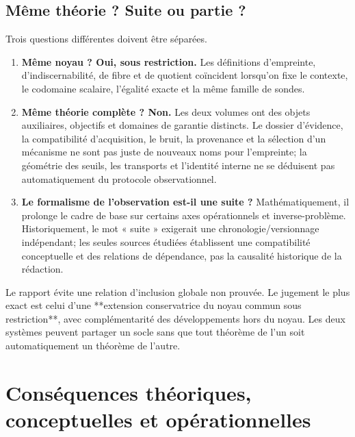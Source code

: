 \documentclass[11pt,a4paper,oneside]{report}
\begin{document}
\section{Même théorie ? Suite ou partie ?}
Trois questions différentes doivent être séparées.
\begin{enumerate}
\item \textbf{Même noyau ? Oui, sous restriction.} Les définitions d'empreinte, d'indiscernabilité, de fibre et de quotient coïncident lorsqu'on fixe le contexte, le codomaine scalaire, l'égalité exacte et la même famille de sondes.
\item \textbf{Même théorie complète ? Non.} Les deux volumes ont des objets auxiliaires, objectifs et domaines de garantie distincts. Le dossier d'évidence, la compatibilité d'acquisition, le bruit, la provenance et la sélection d'un mécanisme ne sont pas juste de nouveaux noms pour l'empreinte; la géométrie des seuils, les transports et l'identité interne ne se déduisent pas automatiquement du protocole observationnel.
\item \textbf{Le formalisme de l'observation est-il une suite ?} Mathématiquement, il prolonge le cadre de base sur certains axes opérationnels et inverse-problème. Historiquement, le mot « suite » exigerait une chronologie/versionnage indépendant; les seules sources étudiées établissent une compatibilité conceptuelle et des relations de dépendance, pas la causalité historique de la rédaction.
\end{enumerate}

Le rapport évite une relation d'inclusion globale non prouvée. Le jugement le plus exact est celui d'une **extension conservatrice du noyau commun sous restriction**, avec complémentarité des développements hors du noyau. Les deux systèmes peuvent partager un socle sans que tout théorème de l'un soit automatiquement un théorème de l'autre.

\chapter{Conséquences théoriques, conceptuelles et opérationnelles}
\end{document}
